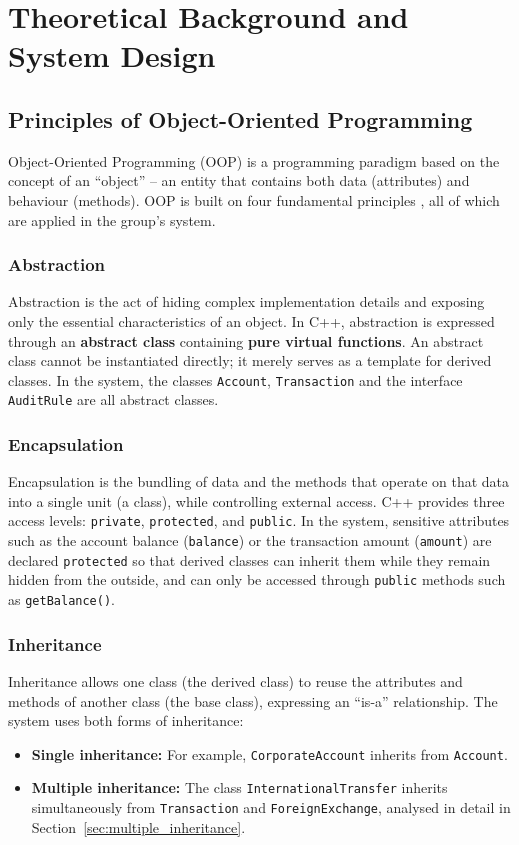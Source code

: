 \chapter{Theoretical Background and System Design}

\section{Principles of Object-Oriented Programming}
    Object-Oriented Programming (OOP) is a programming paradigm based on the concept of an ``object'' -- an entity that contains both data (attributes) and behaviour (methods). OOP is built on four fundamental principles \cite{Stroustrup2013}, all of which are applied in the group's system.

    \subsection{Abstraction}
    Abstraction is the act of hiding complex implementation details and exposing only the essential characteristics of an object. In C++, abstraction is expressed through an \textbf{abstract class} containing \textbf{pure virtual functions}. An abstract class cannot be instantiated directly; it merely serves as a template for derived classes. In the system, the classes \texttt{Account}, \texttt{Transaction} and the interface \texttt{AuditRule} are all abstract classes.

    \subsection{Encapsulation}
    Encapsulation is the bundling of data and the methods that operate on that data into a single unit (a class), while controlling external access. C++ provides three access levels: \texttt{private}, \texttt{protected}, and \texttt{public}. In the system, sensitive attributes such as the account balance (\texttt{balance}) or the transaction amount (\texttt{amount}) are declared \texttt{protected} so that derived classes can inherit them while they remain hidden from the outside, and can only be accessed through \texttt{public} methods such as \texttt{getBalance()}.

    \subsection{Inheritance}
    Inheritance allows one class (the derived class) to reuse the attributes and methods of another class (the base class), expressing an ``is-a'' relationship. The system uses both forms of inheritance:
    \begin{itemize}
        \item \textbf{Single inheritance:} For example, \texttt{CorporateAccount} inherits from \texttt{Account}.
        \item \textbf{Multiple inheritance:} The class \texttt{InternationalTransfer} inherits simultaneously from \texttt{Transaction} and \texttt{ForeignExchange}, analysed in detail in Section~\ref{sec:multiple_inheritance}.
    \end{itemize}

